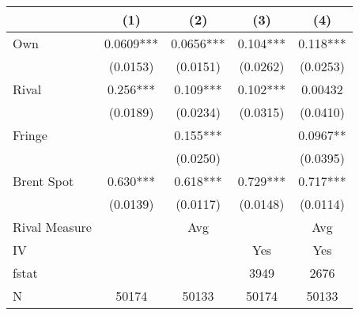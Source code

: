 {
\def\sym#1{\ifmmode^{#1}\else\(^{#1}\)\fi}
\begin{tabular}{l*{4}{c}}
\toprule
                &\multicolumn{1}{c}{(1)}   &\multicolumn{1}{c}{(2)}   &\multicolumn{1}{c}{(3)}   &\multicolumn{1}{c}{(4)}   \\
\midrule
Own             &   0.0609***&   0.0656***&    0.104***&    0.118***\\
                & (0.0153)   & (0.0151)   & (0.0262)   & (0.0253)   \\
\addlinespace
Rival           &    0.256***&    0.109***&    0.102***&  0.00432   \\
                & (0.0189)   & (0.0234)   & (0.0315)   & (0.0410)   \\
\addlinespace
Fringe          &            &    0.155***&            &   0.0967** \\
                &            & (0.0250)   &            & (0.0395)   \\
\addlinespace
Brent Spot      &    0.630***&    0.618***&    0.729***&    0.717***\\
                & (0.0139)   & (0.0117)   & (0.0148)   & (0.0114)   \\
\midrule
Rival Measure   &            &      Avg   &            &      Avg   \\
IV              &            &            &      Yes   &      Yes   \\
fstat           &            &            &     3949   &     2676   \\
N               &    50174   &    50133   &    50174   &    50133   \\
\bottomrule
\end{tabular}
}
